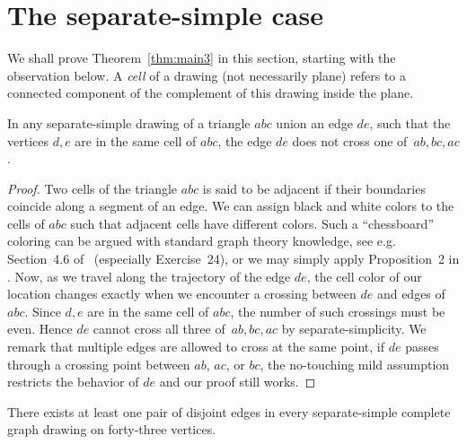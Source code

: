 \documentclass[a4paper,UKenglish,cleveref, autoref, thm-restate]{lipics_arxiv}
\begin{document}
\section{The separate-simple case}\label{sec:separate}

We shall prove Theorem~\ref{thm:main3} in this section, starting with the observation below. A \textit{cell} of a drawing (not necessarily plane) refers to a connected component of the complement of this drawing inside the plane.


\begin{lemma}\label{lem:samecell}
    In any separate-simple drawing of a triangle $abc$ union an edge $de$, such that the vertices $d,e$ are in the same cell of $abc$, the edge $de$ does not cross one of~$ab,bc,ac$.
\end{lemma}

\begin{proof}
Two cells of the triangle $abc$ is said to be adjacent if their boundaries coincide along a segment of an edge. We can assign black and white colors to the cells of $abc$ such that adjacent cells have different colors. Such a ``chessboard'' coloring can be argued with standard graph theory knowledge, see e.g. Section~4.6 of~\cite{diestel2025graph} (especially Exercise~24), or we may simply apply Proposition~2 in \cite{hertrich2022coloring}. Now, as we travel along the trajectory of the edge $de$, the cell color of our location changes exactly when we encounter a crossing between $de$ and edges of $abc$. Since $d,e$ are in the same cell of $abc$, the number of such crossings must be even. Hence $de$ cannot cross all three of~$ab,bc,ac$ by separate-simplicity. We remark that multiple edges are allowed to cross at the same point, if $de$ passes through a crossing point between $ab$, $ac$, or $bc$, the no-touching mild assumption restricts the behavior of $de$ and our proof still works.
\end{proof}

\begin{proposition}\label{prop:separate}
    There exists at least one pair of disjoint edges in every separate-simple complete graph drawing on forty-three vertices. 
\end{proposition}
\end{document}
